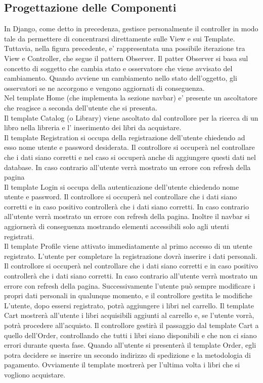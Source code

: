 \documentclass[a4paper, 10pt]{article}
\begin{document}
	\subsection{Progettazione delle Componenti}
	In Django, come detto in precedenza, gestisce personalmente il controller in modo tale
	da permettere di concentrarsi direttamente sulle View e sui Template. 
	Tuttavia, nella figura precedente, e' rappresentata una possibile iterazione 
	tra View e Controller, che segue il pattern Observer. Il patter Observer 
	si basa sul concetto di soggetto che cambia stato e osservatore che viene 
	avvisato del cambiamento. Quando avviene un cambiamento nello stato dell'oggetto, 
	gli osservatori se ne accorgono e vengono aggiornati di conseguenza. \\
	Nel template Home (che implementa la sezione navbar) e' presente un ascoltatore che reagisce 
	a seconda dell'utente che si presenta.  \\ Il template Catalog (o Library) viene 
	ascoltato dal controllore per la ricerca di un libro nella libreria e l'
	inserimento dei libri da acquistare. 
	\\ Il template Registration si occupa della registrazione dell'utente chiedendo ad esso 
	nome utente e password desiderata. 
	Il controllore si occuperà nel controllare che i dati siano corretti e nel caso si
	occuperà anche di aggiungere questi dati nel database. In caso contrario all'utente 
	verrà mostrato un errore con refresh della pagina
	\\ Il template Login si occupa della autenticazione dell'utente chiedendo nome utente 
	e password. Il controllore si occuperà nel controllare che i dati siano corretti e in caso positivo 
	controllerà che i dati siano corretti. In caso contrario all'utente 
	verrà mostrato un errore con refresh della pagina. 
	Inoltre il navbar si aggiornerà di conseguenza mostrando elementi accessibili solo agli utenti
	registrati.
	\\ Il template Profile viene attivato immediatamente al primo accesso di un utente 
	registrato. L'utente per completare la registrazione dovrà inserire i dati personali. 
	Il controllore si occuperà nel controllare che i dati siano corretti e in caso positivo 
	controllerà che i dati siano corretti. In caso contrario all'utente 
	verrà mostrato un errore con refresh della pagina. Successivamente l'utente può sempre modificare
	i propri dati personali in qualunque momento, e il controllore gestita le modifiche 
	\\ L'utente, dopo essersi registrato, potrà aggiungere i libri nel carrello. Il template Cart 
	mostrerà all'utente i libri acquisibili aggiunti al carrello e, 
	se l'utente vorrà, potrà procedere all'acquisto. 
	Il controllore gestirà il passaggio dal template Cart a quello dell'Order, 
	controllando che tutti i libri siano disponibili e che non ci siano errori durante questa fase. 
	Quando all'utente si presenterà il template Order, egli potra decidere se inserire 
	un secondo indirizzo di spedizione e la metodologia di pagamento. 
	Ovviamente il template mostrerà per l'ultima volta i libri che si vogliono acquistare.
	\newpage
\end{document}
